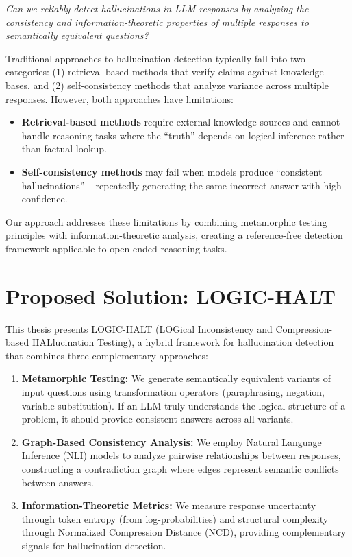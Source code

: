 \textit{Can we reliably detect hallucinations in LLM responses by analyzing the consistency and information-theoretic properties of multiple responses to semantically equivalent questions?}

Traditional approaches to hallucination detection typically fall into two categories: (1) retrieval-based methods that verify claims against knowledge bases, and (2) self-consistency methods that analyze variance across multiple responses. However, both approaches have limitations:

\begin{itemize}
    \item \textbf{Retrieval-based methods} require external knowledge sources and cannot handle reasoning tasks where the ``truth'' depends on logical inference rather than factual lookup.
    \item \textbf{Self-consistency methods} may fail when models produce ``consistent hallucinations'' -- repeatedly generating the same incorrect answer with high confidence.
\end{itemize}

Our approach addresses these limitations by combining metamorphic testing principles with information-theoretic analysis, creating a reference-free detection framework applicable to open-ended reasoning tasks.

\section{Proposed Solution: LOGIC-HALT}

This thesis presents LOGIC-HALT (LOGical Inconsistency and Compression-based HALlucination Testing), a hybrid framework for hallucination detection that combines three complementary approaches:

\begin{enumerate}
    \item \textbf{Metamorphic Testing:} We generate semantically equivalent variants of input questions using transformation operators (paraphrasing, negation, variable substitution). If an LLM truly understands the logical structure of a problem, it should provide consistent answers across all variants.

    \item \textbf{Graph-Based Consistency Analysis:} We employ Natural Language Inference (NLI) models to analyze pairwise relationships between responses, constructing a contradiction graph where edges represent semantic conflicts between answers.

    \item \textbf{Information-Theoretic Metrics:} We measure response uncertainty through token entropy (from log-probabilities) and structural complexity through Normalized Compression Distance (NCD), providing complementary signals for hallucination detection.
\end{enumerate}

